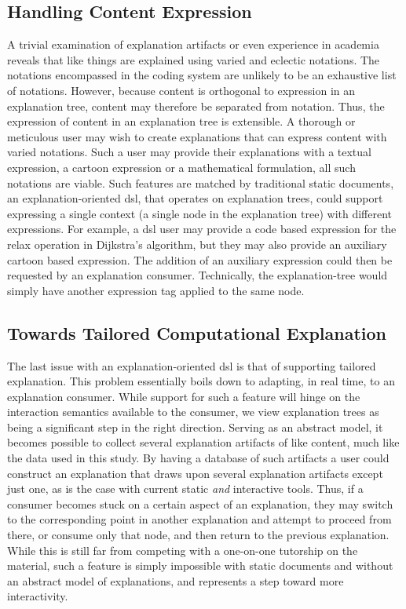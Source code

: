\documentclass[sigconf]{acmart}
\begin{document}
\subsection{Handling Content Expression}
\label{sec:dis:expr}
A trivial examination of explanation artifacts or even experience in academia
reveals that like things are explained using varied and eclectic notations. The
notations encompassed in the coding system are unlikely to be an exhaustive list
of notations. However, because content is orthogonal to expression in an
explanation tree, content may therefore be separated from notation. Thus, the
expression of content in an explanation tree is extensible. A thorough or
meticulous user may wish to create explanations that can express content with
varied notations. Such a user may provide their explanations with a textual
expression, a cartoon expression or a mathematical formulation, all such
notations are viable. Such features are matched by traditional static documents,
an explanation-oriented dsl, that operates on explanation trees, could support
expressing a single context (a single node in the explanation tree) with
different expressions. For example, a dsl user may provide a code based
expression for the relax operation in Dijkstra's algorithm, but they may also
provide an auxiliary cartoon based expression. The addition of an auxiliary
expression could then be requested by an explanation consumer. Technically, the
explanation-tree would simply have another expression tag applied to the same
node. 

\subsection{Towards Tailored Computational Explanation}
\label{sec:dis:tail}
The last issue with an explanation-oriented dsl is that of supporting tailored
explanation. This problem essentially boils down to 
adapting, in real time, to an explanation consumer. While support for such a
feature will hinge on the interaction semantics available to the consumer, we
view explanation trees as being a significant step in the right direction.
Serving as an abstract model, it becomes possible to collect several explanation
artifacts of like content, much like the data used in this study. By having a
database of such artifacts a user could construct an explanation that draws upon
several explanation artifacts except just one, as is the case with current
static \emph{and} interactive tools. Thus, if a consumer becomes stuck on a
certain aspect of an explanation, they may switch to the corresponding point in
another explanation and attempt to proceed from there, or consume only that
node, and then return to the previous explanation. While this is still far
from competing with a one-on-one tutorship on the material, such a feature is
simply impossible with static documents and without an abstract model of
explanations, and represents a step toward more interactivity.  
\end{document}
